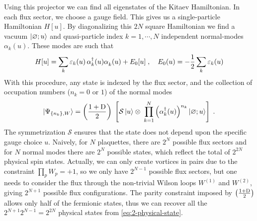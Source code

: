 


Using this projector we can find all eigenstates of the Kitaev Hamiltonian.
In each flux sector, we choose a gauge field.
This gives us a single-particle Hamiltonian $H[u]$. By diagonalizing this $2N$ square Hamiltonian we find a vacuum $\ket{\varnothing;u}$ and quasi-particle index $k=1, \cdots , N$  independent normal-modes $\alpha_k(u)$.
These modes are such that
\begin{equation}
    H[u]
    =  \sum_{k} \varepsilon_k(u) \, \alpha^\dagger_{{k}}(u)\alpha_{k}^\pd(u) + E_0[u] \; , \quad
    E_0(u)=- \frac{1}{2} \sum_{k} \varepsilon_k(u)
\end{equation}
With this procedure, any state is indexed by the flux sector, and the collection of occupation numbers ($n_k=0$ or $1$) of the normal modes
\begin{equation}
    \ket{\Psi_{ \{n_k\},W }} =  \left( \frac{1+\mathrm{D}}{2} \right) \;  \left[ \mathcal{S} \ket{u}\otimes \; \prod_{k=1}^{N} \left(\alpha^{\dagger}_{k}(u) \right)^{n_k}\ket{\varnothing;u} \right] \; . \label{eq:2-physical-state}
\end{equation}
The symmetrization $\mathcal{S}$ ensures that the state does not depend upon the specific gauge choice $u$. Naively, for $N$ plaquettes, there are $2^{N}$ possible flux sectors and for $N$ normal modes there are $2^{N}$ possible states, which reflect the total of $2^{2N}$ physical spin states.
Actually,  we can only create vortices in pairs due to the constraint $\prod_p W_p=+1$, so we only have  $2^{N-1}$ possible flux sectors, but one needs to consider the flux through the non-trivial Wilson loops $W^{(1)}$ and $W^{(2)}$, giving $2^{N+1}$ possible flux configurations. The parity constraint imposed by $\left( \frac{1+\mathrm{D}}{2} \right)$ allows only half of the fermionic states,  thus we can recover all the $2^{N+1}2^{N-1}=2^{2N}$ physical states from \eqref{eq:2-physical-state}.

